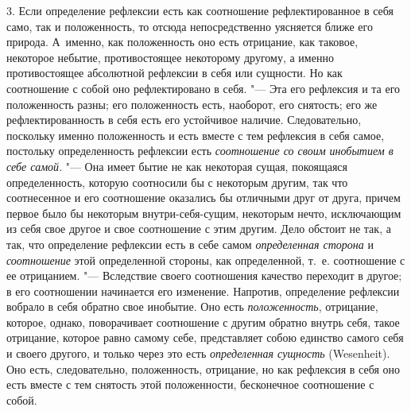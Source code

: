 3. Если определение рефлексии есть как соотношение рефлектированное в себя
само, так и положенность, то отсюда непосредственно уясняется ближе его
природа. А~именно, как положенность оно есть отрицание, как таковое,
некоторое небытие, противостоящее некоторому другому, а именно
противостоящее абсолютной рефлексии в себя или сущности. Но как соотношение
с собой оно рефлектировано в себя. "--- Эта его рефлексия и та его положенность
разны; его положенность есть, наоборот, его снятость; его же
рефлектированность в себя есть его устойчивое наличие. Следовательно,
поскольку именно положенность и есть вместе с тем рефлексия в себя самое,
постольку определенность рефлексии есть
{\em соотношение со своим инобытием в себе самой}. "---
Она имеет бытие не как некоторая сущая, покоящаяся определенность, которую
соотносили бы с некоторым другим, так что соотнесенное и его соотношение
оказались бы отличными друг от друга, причем первое было бы некоторым
внутри-себя-сущим, некоторым нечто, исключающим из себя свое другое и свое
соотношение с этим другим. Дело обстоит не так, а так, что определение
рефлексии есть в себе самом {\em определенная сторона}
и {\em соотношение} этой определенной стороны, как
определенной, т.~е. соотношение с ее отрицанием. "--- Вследствие своего
соотношения качество переходит в другое; в его соотношении начинается его
изменение. Напротив, определение рефлексии вобрало в себя обратно свое
инобытие. Оно есть {\em положенность}, отрицание,
которое, однако, поворачивает соотношение с другим обратно внутрь себя,
такое отрицание, которое равно самому себе, представляет собою единство
самого себя и своего другого, и только через это есть
{\em определенная сущность} (Wesenheit). Оно есть,
следовательно, положенность, отрицание, но как рефлексия в себя оно есть
вместе с тем снятость этой положенности, бесконечное соотношение с собой.

